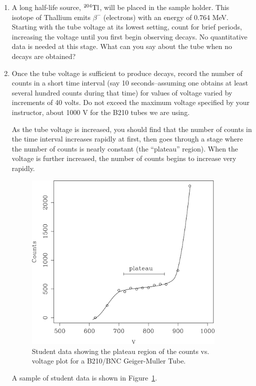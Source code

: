 \begin{enumerate}
\item A long half-life source, ${}^{204}{\rm Tl}$, will be placed in the sample
  holder.  This isotope of Thallium emits $\beta^-$ (electrons) with an energy
  of 0.764 MeV.  Starting with the tube voltage at its lowest setting, count for
  brief periods, increasing the voltage until you first begin observing decays.
  No quantitative data is needed at this stage.  What can you say about the tube
  when no decays are obtained?

\item Once the tube voltage is sufficient to produce decays, record the number
  of counts in a short time interval (say 10 seconds--assuming one obtains at
  least several hundred counts during that time) for values of voltage varied by
  increments of 40 volts.  Do not exceed the maximum voltage specified by your
  instructor, about 1000 V for the B210 tubes we are using.

As the tube voltage is increased, you should find that the number of
counts in the time interval increases rapidly at first, then goes
through a stage where the number of counts is nearly constant (the
``plateau'' region).  When the voltage is
further increased, the number of counts begins to increase very
rapidly.
\begin{figure}
\begin{centering}
\includegraphics[width=3.8in]{../images/gmplateau.png}
\caption{Student data showing the plateau region of the counts vs. voltage plot for a B210/BNC Geiger-Muller Tube.}
\label{fig:rate-V}
\end{centering}
\end{figure}
A sample of student data is shown in Figure~\ref{fig:rate-V}.


\end{enumerate}
